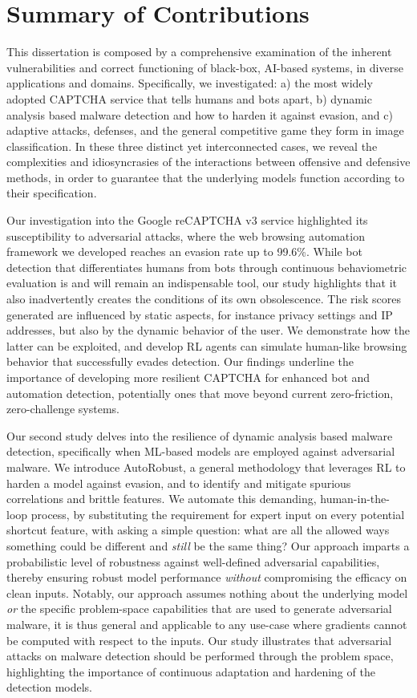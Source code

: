 \section{Summary of Contributions}
This dissertation is composed by a comprehensive examination of the inherent vulnerabilities and correct functioning of black-box, AI-based systems, in diverse applications and domains.
Specifically, we investigated: a) the most widely adopted CAPTCHA service that tells humans and bots apart, b) dynamic analysis based malware detection and how to harden it against evasion, and c) adaptive attacks, defenses, and the general competitive game they form in image classification.
In these three distinct yet interconnected cases, we reveal the complexities and idiosyncrasies of the interactions between offensive and defensive methods, in order to guarantee that the underlying models function according to their specification.

Our investigation into the Google reCAPTCHA v3 service highlighted its susceptibility to adversarial attacks, where the web browsing automation framework we developed reaches an evasion rate up to 99.6\%.
While bot detection that differentiates humans from bots through continuous behaviometric evaluation is and will remain an indispensable tool, our study highlights that it also inadvertently creates the conditions of its own obsolescence.
The risk scores generated are influenced by static aspects, for instance privacy settings and IP addresses, but also by the dynamic behavior of the user.
We demonstrate how the latter can be exploited, and develop \gls{RL} agents can simulate human-like browsing behavior that successfully evades detection.
Our findings underline the importance of developing more resilient CAPTCHA for enhanced bot and automation detection, potentially ones that move beyond current zero-friction, zero-challenge systems.

Our second study delves into the resilience of dynamic analysis based malware detection, specifically when ML-based models are employed against adversarial malware.
We introduce AutoRobust, a general methodology that leverages \gls{RL} to harden a model against evasion, and to identify and mitigate spurious correlations and brittle features.
We automate this demanding, human-in-the-loop process, by substituting the requirement for expert input on every potential shortcut feature, with asking a simple question: what are all the allowed ways something could be different and \textit{still} be the same thing?
Our approach imparts a probabilistic level of robustness against well-defined adversarial capabilities, thereby ensuring robust model performance \textit{without} compromising the efficacy on clean inputs.
Notably, our approach assumes nothing about the underlying model \textit{or} the specific problem-space capabilities that are used to generate adversarial malware, it is thus general and applicable to any use-case where gradients cannot be computed with respect to the inputs.
Our study illustrates that adversarial attacks on malware detection should be performed through the problem space, highlighting the importance of continuous adaptation and hardening of the detection models.

